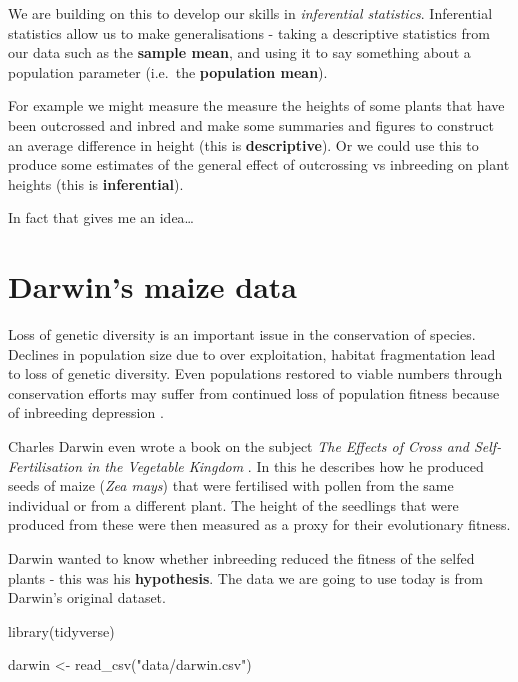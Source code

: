 \documentclass[
]{book}
\newenvironment{Shaded}{\begin{snugshade}}{\end{snugshade}}
\newcommand{\FunctionTok}[1]{\textcolor[rgb]{0.00,0.00,0.00}{#1}}
\newcommand{\NormalTok}[1]{#1}
\newcommand{\OtherTok}[1]{\textcolor[rgb]{0.56,0.35,0.01}{#1}}
\newcommand{\StringTok}[1]{\textcolor[rgb]{0.31,0.60,0.02}{#1}}
\begin{document}
We are building on this to develop our skills in \emph{inferential statistics}. Inferential statistics allow us to make generalisations - taking a descriptive statistics from our data such as the \textbf{sample mean}, and using it to say something about a population parameter (i.e.~the \textbf{population mean}).

For example we might measure the measure the heights of some plants that have been outcrossed and inbred and make some summaries and figures to construct an average difference in height (this is \textbf{descriptive}). Or we could use this to produce some estimates of the general effect of outcrossing vs inbreeding on plant heights (this is \textbf{inferential}).

In fact that gives me an idea\ldots{}

\hypertarget{darwins-maize-data}{%
\section{Darwin's maize data}\label{darwins-maize-data}}

Loss of genetic diversity is an important issue in the conservation of species. Declines in population size due to over exploitation, habitat fragmentation lead to loss of genetic diversity. Even populations restored to viable numbers through conservation efforts may suffer from continued loss of population fitness because of inbreeding depression \citet{Rescue}.

Charles Darwin even wrote a book on the subject \emph{The Effects of Cross and Self-Fertilisation in the Vegetable Kingdom} \citet{Cross}. In this he describes how he produced seeds of maize (\emph{Zea mays}) that were fertilised with pollen from the same individual or from a different plant. The height of the seedlings that were produced from these were then measured as a proxy for their evolutionary fitness.

Darwin wanted to know whether inbreeding reduced the fitness of the selfed plants - this was his \textbf{hypothesis}. The data we are going to use today is from Darwin's original dataset.

\begin{Shaded}
\begin{Highlighting}[]
\FunctionTok{library}\NormalTok{(tidyverse)}

\NormalTok{darwin }\OtherTok{\textless{}{-}} \FunctionTok{read\_csv}\NormalTok{(}\StringTok{"data/darwin.csv"}\NormalTok{)}
\end{Highlighting}
\end{Shaded}
\end{document}
